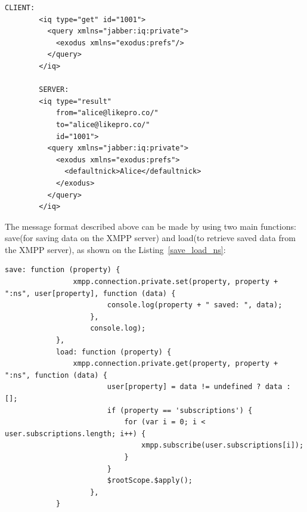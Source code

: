      \begin{lstlisting}[label=code:client_load,caption=Client Retrieves Private Data]
		CLIENT:
		<iq type="get" id="1001">
		  <query xmlns="jabber:iq:private">
		    <exodus xmlns="exodus:prefs"/>
		  </query>
		</iq>

		SERVER:
		<iq type="result"
		    from="alice@likepro.co/"
		    to="alice@likepro.co/"
		    id="1001">
		  <query xmlns="jabber:iq:private">
		    <exodus xmlns="exodus:prefs">
		      <defaultnick>Alice</defaultnick>
		    </exodus>
		  </query>
		</iq>
    \end{lstlisting}

    The message format described above can be made by using two main functions: save(for saving data on the XMPP server) and load(to retrieve saved data from the XMPP server), as shown on the Listing~\ref{save_load_ns}:
	\begin{lstlisting}[label=save_load_ns,caption=Snippet of Save/Load preferences to a private namespace]
	      	save: function (property) {
	            xmpp.connection.private.set(property, property + ":ns", user[property], function (data) {
	                    console.log(property + " saved: ", data);
	                },
	                console.log);
	        },
	        load: function (property) {
	            xmpp.connection.private.get(property, property + ":ns", function (data) {
	                    user[property] = data != undefined ? data : [];
	                    if (property == 'subscriptions') {
	                        for (var i = 0; i < user.subscriptions.length; i++) {
	                            xmpp.subscribe(user.subscriptions[i]);
	                        }
	                    }
	                    $rootScope.$apply();
	                },
	        }
	\end{lstlisting}


